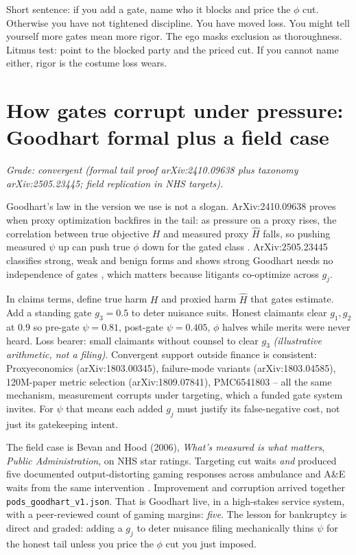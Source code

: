 Short sentence: if you add a gate, name who it blocks and price the $\phi$ cut. Otherwise you have not tightened discipline. You have moved loss. You might tell yourself more gates mean more rigor. The ego masks exclusion as thoroughness. Litmus test: point to the blocked party and the priced cut. If you cannot name either, rigor is the costume loss wears.

\section{How gates corrupt under pressure: Goodhart formal plus a field case}
\label{sec:goodhart}

\textit{Grade: convergent (formal tail proof arXiv:2410.09638 plus taxonomy arXiv:2505.23445; field replication in NHS targets).}

Goodhart's law in the version we use is not a slogan. ArXiv:2410.09638 proves when proxy optimization backfires in the tail: as pressure on a proxy rises, the correlation between true objective $H$ and measured proxy $\hat H$ falls, so pushing measured $\psi$ up can push true $\phi$ down for the gated class \citep{goodhart2410}. ArXiv:2505.23445 classifies strong, weak and benign forms and shows strong Goodhart needs no independence of gates \citep{goodhart2505}, which matters because litigants co-optimize across $g_j$.

In claims terms, define true harm $H$ and proxied harm $\hat H$ that gates estimate. Add a standing gate $g_3=0.5$ to deter nuisance suits. Honest claimants clear $g_1,g_2$ at $0.9$ so pre-gate $\psi=0.81$, post-gate $\psi=0.405$, $\phi$ halves while merits were never heard. Loss bearer: small claimants without counsel to clear $g_3$ \textit{(illustrative arithmetic, not a filing)}. Convergent support outside finance is consistent: Proxyeconomics (arXiv:1803.00345), failure-mode variants (arXiv:1803.04585), 120M-paper metric selection (arXiv:1809.07841), PMC6541803 -- all the same mechanism, measurement corrupts under targeting, which a funded gate system invites. For $\psi$ that means each added $g_j$ must justify its false-negative cost, not just its gatekeeping intent.

The field case is Bevan and Hood (2006), \textit{What's measured is what matters}, \textit{Public Administration}, on NHS star ratings. Targeting cut waits \textit{and} produced five documented output-distorting gaming responses across ambulance and A\&E waits from the same intervention \citep{bevan2006}. Improvement and corruption arrived together \texttt{pods\_goodhart\_v1.json}. That is Goodhart live, in a high-stakes service system, with a peer-reviewed count of gaming margins: \textit{five}. The lesson for bankruptcy is direct and graded: adding a $g_j$ to deter nuisance filing mechanically thins $\psi$ for the honest tail unless you price the $\phi$ cut you just imposed.

